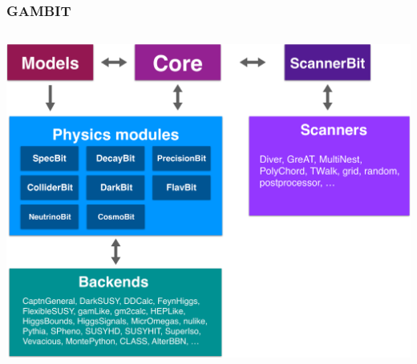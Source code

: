 \documentclass[aspectratio=169]{beamer}
\begin{document}
\begin{frame}


    
\end{frame}

\begin{frame}
    \frametitle{GAMBIT}
    \begin{columns}
        \includegraphics[width=\textwidth]{figures/gambit_layout}
    \end{columns}
\end{frame}
\end{document}
